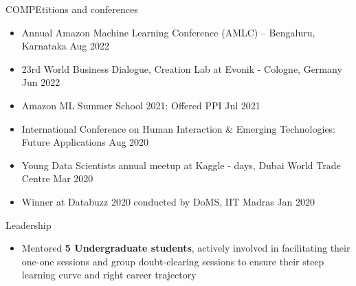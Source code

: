 \documentclass{resume} %
\begin{document}
\begin{rSection}{COMPEtitions and conferences} 
\begin{itemize}
    \item 	Annual Amazon Machine Learning Conference (AMLC) – Bengaluru, Karnataka \hfill Aug 2022
    \item	23rd World Business Dialogue, Creation Lab at Evonik - Cologne, Germany \hfill Jun 2022
    \item Amazon ML Summer School 2021: Offered PPI \hfill Jul 2021
    \item International Conference on Human Interaction & Emerging Technologies: Future Applications \hfill Aug 2020
    \item Young Data Scientists annual meetup at Kaggle - days, Dubai World Trade Centre \hfill Mar 2020
    \item Winner at Databuzz 2020 conducted by DoMS, IIT Madras \hfill Jan 2020
\end{itemize}


\end{rSection}

\begin{rSection}{Leadership} 
\begin{itemize}
    \item Mentored \textbf{5 Undergraduate students}, actively involved in facilitating their one-one sessions and group doubt-clearing sessions to ensure their steep learning curve and right career trajectory
\end{itemize}


\end{rSection}
\end{document}
